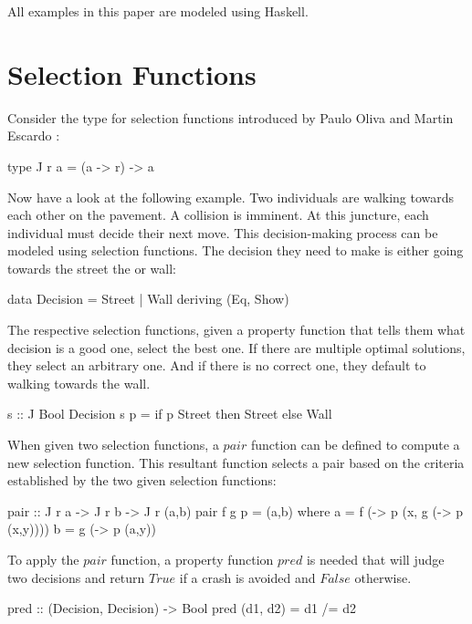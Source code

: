 \documentclass[runningheads]{llncs}
\begin{document}
All examples in this paper are modeled using Haskell.

\section{Selection Functions}\label{selection-functions}

Consider the type for selection functions introduced by Paulo Oliva and
Martin Escardo \cite{escardo2010selection} :

\begin{code}
type J r a = (a -> r) -> a
\end{code}

Now have a look at the following example. Two individuals are walking
towards each other on the pavement. A collision is imminent. At this
juncture, each individual must decide their next move. This
decision-making process can be modeled using selection functions. The
decision they need to make is either going towards the street the or
wall:

\begin{code}
data Decision = Street | Wall deriving (Eq, Show)
\end{code}

The respective selection functions, given a property function that tells
them what decision is a good one, select the best one. If there are
multiple optimal solutions, they select an arbitrary one. And if there
is no correct one, they default to walking towards the wall.

\begin{code}
s :: J Bool Decision
s p = if p Street then Street else Wall
\end{code}

When given two selection functions, a \(pair\) function can be defined
to compute a new selection function. This resultant function selects a
pair based on the criteria established by the two given selection
functions:

\begin{code}
pair :: J r a -> J r b -> J r (a,b)
pair f g p = (a,b)
  where
      a = f (\x -> p (x, g (\y -> p (x,y))))
      b = g (\y -> p (a,y))
\end{code}

To apply the \(pair\) function, a property function \(pred\) is needed
that will judge two decisions and return \(True\) if a crash is avoided
and \(False\) otherwise.

\begin{code}
pred :: (Decision, Decision) -> Bool
pred (d1, d2) = d1 /= d2
\end{code}
\end{document}
